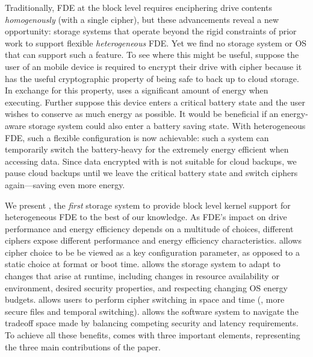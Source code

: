 Traditionally, FDE at the block level requires enciphering drive contents {\em
homogenously} (with a single cipher), but these advancements reveal a new
opportunity: storage systems that operate beyond the rigid constraints of prior
work to support flexible {\em heterogeneous} FDE. Yet we find no storage system
or OS that can support such a feature. To see where this might be useful,
suppose the user of an mobile device is required to encrypt their drive with
cipher \encA because it has the useful cryptographic property of being safe to
back up to cloud storage. In exchange for this property, \encA uses a
significant amount of energy when executing. Further suppose this device enters
a critical battery state and the user wishes to conserve as much energy as
possible. It would be beneficial if an energy-aware storage system could also
enter a battery saving state. With heterogeneous FDE, such a flexible
configuration is now achievable: such a system can temporarily switch the
battery-heavy \encA for the extremely energy efficient \encB when accessing
data. Since data encrypted with \encB is not suitable for cloud backups, we
pause cloud backups until we leave the critical battery state and switch ciphers
again---saving even more energy.


We present \sys, the {\em first} storage system to provide block level kernel
support for heterogeneous FDE to the best of our knowledge. As FDE's impact on
drive performance and energy efficiency depends on a multitude of choices,
different ciphers expose different performance and energy efficiency
characteristics. \sys allows cipher choice to be be viewed as a key
configuration parameter, as opposed to a static choice at format or boot time.
\sys allows the storage system to adapt to changes that arise at runtime,
including changes in resource availability or environment, desired security
properties, and respecting changing OS energy budgets. \sys allows users to
perform cipher switching in space and time (\eg, more secure files and temporal
switching). \sys allows the software system to navigate the tradeoff space made
by balancing competing security and latency requirements.  To achieve all these benefits,
\sys comes with three important elements, representing the three main
contributions of the paper.

